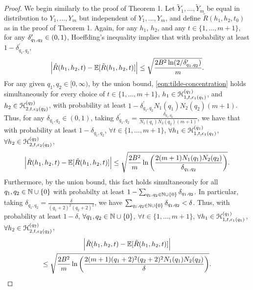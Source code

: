 \documentclass{article}
\begin{document}
\begin{proof}
We begin similarly to the proof of Theorem 1.
Let $\tilde{Y}_{1},\ldots,\tilde{Y}_{m}$ be equal in distribution to $Y_{1},\ldots,Y_{m}$
but independent of $Y_{1},\ldots,Y_{m}$, and define $\tilde{R}(h_{1},h_{2},t_{0})$ as in 
the proof of Theorem 1.
Again, for any $h_{1}$, $h_{2}$, and any $t \in \{1,\ldots,m+1\}$, 
for any $\delta_{q_{1},q_{2}}^{\prime} \in (0,1)$, 
Hoeffding's inequality implies that with probability at least $1-\delta_{q_{1},q_{2}}^{\prime}$, 
\begin{equation}
\label{eqn:tilde-concentration}
\left| \hat{R}(h_{1},h_{2},t) - \mathbb{E}[\tilde{R}(h_{1},h_{2},t)] \right| \leq \sqrt{\frac{2B^{2}\ln(2/\delta_{q_{1},q_{2}}^{\prime})}{m}}.
\end{equation}
For any given $q_{1}, q_{2} \in [0,\infty)$, 
by the union bound, \eqref{eqn:tilde-concentration} holds simultaneously for every choice of 
$t \in \{1,\ldots,m+1\}$, $h_{1} \in \mathcal H_{1,t,\epsilon_{1}(q_{1})}^{(q_{1})}$, and $h_{2} \in \mathcal H_{2,t,\epsilon_{2}(q_{2})}^{(q_{2})}$, 
with probability at least $1 - \delta_{q_{1},q_{2}}^{\prime} N_{1}(q_{1}) N_{2}(q_{2}) (m+1)$.
Thus, for any $\delta_{q_{1},q_{2}} \in (0,1)$, 
taking $\delta_{q_{1},q_{2}}^{\prime} = \frac{\delta_{q_{1},q_{2}}}{N_{1}(q_{1}) N_{2}(q_{2}) (m+1)}$, 
we have that with probability at least $1-\delta_{q_{1},q_{2}}$, 
$\forall t \in \{1,\ldots,m+1\}$,
$\forall h_{1} \in \mathcal H_{1,t,\epsilon_{1}(q_{1})}^{(q_{1})}$, $\forall h_{2} \in \mathcal H_{2,t,\epsilon_{2}(q_{2})}^{(q_{2})}$,
\begin{equation*}
\left| \hat{R}(h_{1},h_{2},t) - \mathbb{E}[\tilde{R}(h_{1},h_{2},t)] \right| \leq \sqrt{\frac{2B^{2}}{m}\ln\left(\frac{2 (m+1) N_{1}(q_{1}) N_{2}(q_{2}) }{\delta_{q_{1},q_{2}}}\right)}.
\end{equation*}
Furthermore, by the union bound, this fact holds simultaneously for all $q_{1},q_{2} \in \mathbb{N} \cup \{0\}$ with probabilty at least 
$1 - \sum_{q_{1}, q_{2} \in \mathbb{N}\cup\{0\}} \delta_{q_{1},q_{2}}$.  In particular, taking $\delta_{q_{1},q_{2}} = \frac{\delta}{(q_{1}+2)^{2}(q_{2}+2)^{2}}$,
we have $\sum_{q_{1},q_{2} \in \mathbb{N}\cup\{0\}} \delta_{q_{1},q_{2}} < \delta$.
Thus, with probability at least $1-\delta$, 
$\forall q_{1},q_{2} \in \mathbb{N} \cup \{0\}$, 
$\forall t \in \{1,\ldots,m+1\}$,
$\forall h_{1} \in \mathcal H_{1,t,\epsilon_{1}(q_{1})}^{(q_{1})}$, $\forall h_{2} \in \mathcal H_{2,t,\epsilon_{2}(q_{2})}^{(q_{2})}$,
\begin{multline*}
\left| \hat{R}(h_{1},h_{2},t) - \E[\tilde{R}(h_{1},h_{2},t)] \right| 
\\ \leq \sqrt{\frac{2B^{2}}{m}\ln\left(\frac{2 (m+1) (q_{1}+2)^{2} (q_{2}+2)^{2} N_{1}(q_{1}) N_{2}(q_{2})}{\delta}\right)}.

\end{multline*}
\end{proof}
\end{document}
